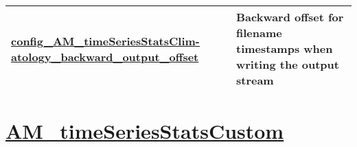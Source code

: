 {\begin{center}
\begin{longtable}{| p{2.0in} || p{4.0in} |}
    \hline
    \hyperref[subsec:nm_sec_config_AM_timeSeriesStatsClimatology_backward_output_offset]{config\_AM\_timeSeriesStatsClim-}\hyperref[subsec:nm_sec_config_AM_timeSeriesStatsClimatology_backward_output_offset]{atology\_backward\_output\_offset}& Backward offset for filename timestamps when writing the output stream \\
    \hline
\end{longtable}
\end{center}
}
\section[AM\_timeSeriesStatsCustom]{\hyperref[sec:nm_sec_AM_timeSeriesStatsCustom]{AM\_timeSeriesStatsCustom}}
\label{sec:nm_tab_AM_timeSeriesStatsCustom}

\vspace{0.5in}
